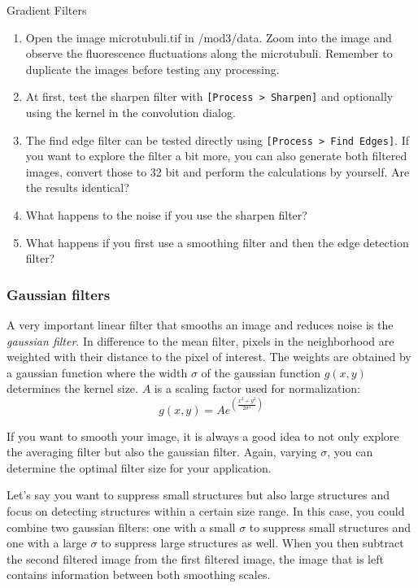 \begin{taskbox}{Gradient Filters}
\begin{enumerate}
	\item Open the image microtubuli.tif in /mod3/data. Zoom into the image and observe the fluorescence fluctuations along the microtubuli. Remember to duplicate the images before testing any processing.
	\item At first, test the sharpen filter with \texttt{[Process > Sharpen]} and optionally using the kernel in the convolution dialog.
	\item The find edge filter can be tested directly using \texttt{[Process > Find Edges]}. If you want to explore the filter a bit more, you can also generate both filtered images, convert those to 32 bit and perform the calculations by yourself. Are the results identical?
	\item What happens to the noise if you use the sharpen filter? 
	\item What happens if you first use a smoothing filter and then the edge detection filter?
	\end{enumerate}
\end{taskbox}

\subsubsection{Gaussian filters}

A very important linear filter that smooths an image and reduces noise is the \emph{gaussian filter}. In difference to the mean filter, pixels in the neighborhood are weighted with their distance to the pixel of interest. The weights are obtained by a gaussian function where the width $\sigma$ of the gaussian function $g(x,y)$determines the kernel size. $A$ is a scaling factor used for normalization:
\[
	g(x,y)=A e^{\left(\frac{x^2+y^2}{2\sigma^2}\right)}
\]

If you want to smooth your image, it is always a good idea to not only explore the averaging filter but also the gaussian filter. Again, varying $\sigma$, you can determine the optimal filter size for your application.

Let's say you want to suppress small structures but also large structures and focus on detecting structures within a certain size range. In this case, you could combine two gaussian filters: one with a small $\sigma$ to suppress small structures and one with a large $\sigma$ to suppress large structures as well. When you then subtract the second filtered image from the first filtered image, the image that is left contains information between both smoothing scales. 

